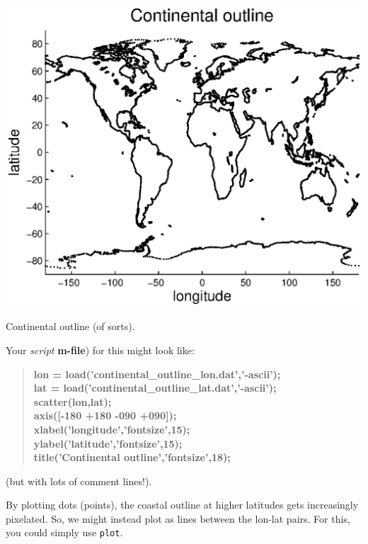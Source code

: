 \documentclass{tufte-book} %
\newenvironment{docspecbold}{\begin{quotation}\ttfamily\bfseries\parskip0pt\parindent0pt\ignorespaces}{\end{quotation}}
\begin{document}
\begin{marginfigure}[0.0in]
\includegraphics[width=\linewidth]{ch3-continentaloutline.eps}
\caption{Continental outline (of sorts).}
\label{fig:ch3-continentaloutline}
\end{marginfigure}

Your \textit{script} \textbf{m-file}) for this might look like:

\begin{docspecbold}
lon = load('continental\_outline\_lon.dat','-ascii');
\\lat = load('continental\_outline\_lat.dat','-ascii');
\\scatter(lon,lat);
\\axis([-180 +180 -090 +090]);
\\xlabel('longitude','fontsize',15);
\\ylabel('latitude','fontsize',15);
\\title('Continental outline','fontsize',18);
\end{docspecbold}

\noindent (but with lots of comment lines!).

By plotting dots (points), the coastal outline at higher latitudes gets increasingly pixelated. So, we might instead plot as lines between the lon-lat pairs. For this, you could simply use \texttt{plot}. 
\end{document}
